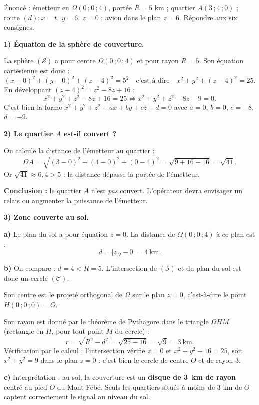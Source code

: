 \documentclass[11pt]{article}
\newcommand{\cle}[1]{{\popxbold\color{popdark}#1}}
\begin{document}
\begin{exoresolu}
Énoncé : émetteur en $\Omega(0\,;0\,;4)$, portée $R=5$ km ; quartier $A(3\,;4\,;0)$ ; route $(d):x=t,\ y=6,\ z=0$ ; avion dans le plan $z=6$. Répondre aux six consignes.

\tcblower

\textbf{1) Équation de la sphère de couverture.}

La sphère $(\mathcal{S})$ a pour centre $\Omega(0\,;0\,;4)$ et pour rayon $R=5$. Son équation cartésienne est donc :
\[ (x-0)^{2}+(y-0)^{2}+(z-4)^{2}=5^{2} \quad\text{c'est-à-dire}\quad x^{2}+y^{2}+(z-4)^{2}=25. \]
En développant $(z-4)^{2}=z^{2}-8z+16$ :
\[ x^{2}+y^{2}+z^{2}-8z+16=25 \iff x^{2}+y^{2}+z^{2}-8z-9=0. \]
C'est bien la forme $x^{2}+y^{2}+z^{2}+ax+by+cz+d=0$ avec $a=0$, $b=0$, $c=-8$, $d=-9$.

\textbf{2) Le quartier $A$ est-il couvert ?}

On calcule la distance de l'émetteur au quartier :
\[ \Omega A=\sqrt{(3-0)^{2}+(4-0)^{2}+(0-4)^{2}}=\sqrt{9+16+16}=\sqrt{41}. \]
Or $\sqrt{41}\approx 6{,}4 > 5$ : la distance dépasse la portée de l'émetteur.

\textbf{Conclusion :} le quartier $A$ n'est \emph{pas} couvert. L'opérateur devra envisager un relais ou augmenter la puissance de l'émetteur.

\textbf{3) Zone couverte au sol.}

\textbf{a)} Le plan du sol a pour équation $z=0$. La distance de $\Omega(0\,;0\,;4)$ à ce plan est :
\[ d=\lvert z_\Omega - 0\rvert = 4 \ \text{km}. \]

\textbf{b)} On compare : $d=4 < R=5$. L'intersection de $(\mathcal{S})$ et du plan du sol est donc un \cle{cercle} $(\mathcal{C})$.

Son centre est le projeté orthogonal de $\Omega$ sur le plan $z=0$, c'est-à-dire le point $H(0\,;0\,;0)=O$.

Son rayon est donné par le théorème de Pythagore dans le triangle $\Omega HM$ (rectangle en $H$, pour tout point $M$ du cercle) :
\[ r=\sqrt{R^{2}-d^{2}}=\sqrt{25-16}=\sqrt{9}=3 \ \text{km}. \]
Vérification par le calcul : l'intersection vérifie $z=0$ et $x^{2}+y^{2}+16=25$, soit $x^{2}+y^{2}=9$ dans le plan $z=0$ : c'est bien le cercle de centre $O$ et de rayon $3$.

\textbf{c)} Interprétation : au sol, la couverture est un \textbf{disque de \SI{3}{km} de rayon} centré au pied $O$ du Mont Fébé. Seuls les quartiers situés à moins de $3$ km de $O$ captent correctement le signal au niveau du sol.


\end{exoresolu}
\end{document}
